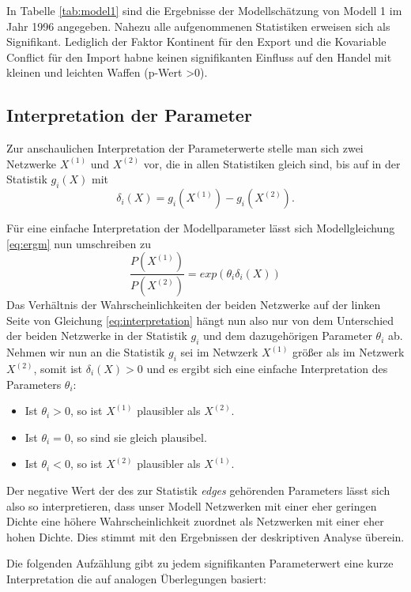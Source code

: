 \documentclass[a4paper,ngerman,oneside,titlepage,bibliography=totoc,11pt]{scrreprt}
\begin{document}
In Tabelle \ref{tab:model1} sind die Ergebnisse der Modellschätzung von Modell 1 im Jahr 1996 angegeben. Nahezu alle aufgenommenen Statistiken erweisen sich als Signifikant. Lediglich der Faktor Kontinent für den Export und die Kovariable Conflict für den Import habne keinen signifikanten Einfluss auf den Handel mit kleinen und leichten Waffen (p-Wert >0).

\subsection{Interpretation der Parameter}
Zur anschaulichen Interpretation der Parameterwerte stelle man sich zwei Netzwerke $X^{(1)}$ und $X^{(2)}$ vor, die in allen Statistiken gleich sind, bis auf in der Statistik $g_i(X)$ mit
$$\delta_i(X) = g_i(X^{(1)}) - g_i(X^{(2)}).$$


Für eine einfache Interpretation der Modellparameter lässt sich Modellgleichung \ref{eq:ergm} nun umschreiben zu 
\begin{equation}
\frac{P(X^{(1)})}{P(X^{(2)})} = exp(\theta_i \delta_i(X))
	\label{eq:interpretation}
\end{equation}
Das Verhältnis der Wahrscheinlichkeiten der beiden Netzwerke auf der linken Seite von Gleichung \ref{eq:interpretation} hängt nun also nur von dem Unterschied der beiden Netzwerke in der Statistik $g_i$ und dem dazugehörigen Parameter $\theta_i$ ab. Nehmen wir nun an die Statistik $g_i$ sei im Netwzerk $X^{(1)}$ größer als im Netzwerk $X^{(2)}$, somit ist $\delta_i(X) > 0$ und es ergibt sich eine einfache Interpretation des Parameters $\theta_i$:
	\begin{itemize}
		\item Ist $\theta_i > 0$, so ist $X^{(1)}$ plausibler als $X^{(2)}$.
		\item Ist $\theta_i = 0$, so sind sie gleich plausibel.
		\item Ist $\theta_i < 0$, so ist $X^{(2)}$ plausibler als $X^{(1)}$.
	\end{itemize} 
Der negative Wert der des zur Statistik \emph{edges} gehörenden Parameters lässt sich also so interpretieren, dass unser Modell Netzwerken mit einer eher geringen Dichte eine höhere Wahrscheinlichkeit zuordnet als Netzwerken mit einer eher hohen Dichte. Dies stimmt mit den Ergebnissen der deskriptiven Analyse überein.  

Die folgenden Aufzählung gibt zu jedem signifikanten Parameterwert eine kurze Interpretation die auf analogen Überlegungen basiert:
\end{document}
